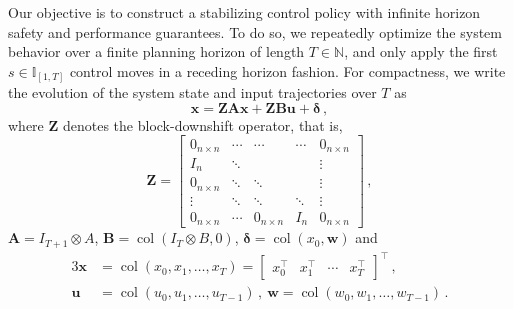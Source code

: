 \documentclass[conference]{IEEEtran}
\begin{document}
Our objective is to construct a stabilizing control policy with infinite horizon safety and performance guarantees. To do so, we repeatedly optimize the system behavior over a finite planning horizon of length $T \in \mathbb{N}$, and only apply the first $s \in \mathbb{I}_{[1, T]}$ control moves in a receding horizon fashion. For compactness, we write the evolution of the system state and input trajectories over $T$ as
\begin{equation*}
    \mathbf{x} = \mathbf{Z}\mathbf{A}\mathbf{x} + \mathbf{Z}\mathbf{B}\mathbf{u} + \bm{\delta}\,,
\end{equation*}
where $\mathbf{Z}$ denotes the block-downshift operator, that is, %
\begin{equation*}
    \mathbf{Z} = \begin{bmatrix}
        0_{n \times n} & \cdots & \cdots & \cdots & 0_{n \times n}\\
        I_n & \ddots & & & \vdots\\
        0_{n \times n} & \ddots & \ddots & & \vdots\\
        \vdots & \ddots & \ddots & \ddots & \vdots\\
        0_{n \times n} & \cdots & 0_{n \times n} & I_n & 0_{n \times n}
    \end{bmatrix}\,,
\end{equation*}
$\mathbf{A} = I_{T+1} \otimes A$, $\mathbf{B} = \operatorname{col}(I_{T} \otimes B, 0)$, $\bm{\delta} = \operatorname{col}(x_0, \mathbf{w})$ and
\begin{alignat*}{3}
    \mathbf{x} &= \operatorname{col}(x_0, x_1, \dots, x_T) =
    \begin{bmatrix}
        x_0^\top & x_1^\top & \cdots & x_{T}^\top \end{bmatrix}^\top\,,\\
    \mathbf{u} &= \operatorname{col}(u_0, u_1, \dots, u_{T-1})\,, ~ \mathbf{w} = \operatorname{col}(w_0, w_1, \dots, w_{T-1})\,.
\end{alignat*}
\end{document}
